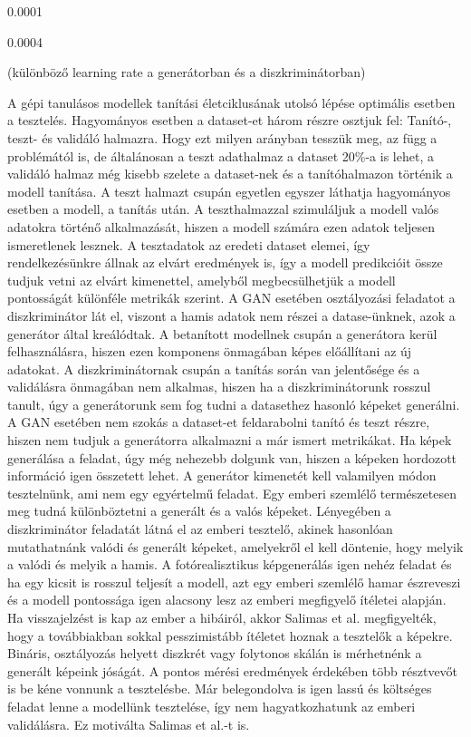 0.0001

0.0004

(különböző learning rate a generátorban és a diszkriminátorban)





A gépi tanulásos modellek tanítási életciklusának utolsó lépése optimális esetben a tesztelés. Hagyományos esetben a dataset-et három részre osztjuk fel: Tanító-, teszt- és validáló halmazra. Hogy ezt milyen arányban tesszük meg, az függ a problémától is, de általánosan a teszt adathalmaz a dataset 20\%-a is lehet, a validáló halmaz még kisebb szelete a dataset-nek és a tanítóhalmazon történik a modell tanítása.
A teszt halmazt csupán egyetlen egyszer láthatja hagyományos esetben a modell, a tanítás után.
A teszthalmazzal szimuláljuk a modell valós adatokra történő alkalmazását, hiszen a modell számára ezen adatok teljesen ismeretlenek lesznek. A tesztadatok az eredeti dataset elemei, így rendelkezésünkre állnak az elvárt eredmények is, így a modell predikcióit össze tudjuk vetni az elvárt kimenettel, amelyből megbecsülhetjük a modell pontosságát különféle metrikák szerint.
A GAN esetében osztályozási feladatot a diszkriminátor lát el, viszont a hamis adatok nem részei a datase-ünknek, azok a generátor által kreálódtak. A betanított modellnek csupán a generátora kerül felhasználásra, hiszen ezen komponens önmagában képes előállítani az új adatokat. A diszkriminátornak csupán a tanítás során van jelentősége és a validálásra önmagában nem alkalmas, hiszen ha a diszkriminátorunk rosszul tanult, úgy a generátorunk sem fog tudni a datasethez hasonló képeket generálni.
A GAN esetében nem szokás a dataset-et feldarabolni tanító és teszt részre, hiszen nem tudjuk a generátorra alkalmazni a már ismert metrikákat.
Ha képek generálása a feladat, úgy még nehezebb dolgunk van, hiszen a képeken hordozott információ igen összetett lehet.
A generátor kimenetét kell valamilyen módon tesztelnünk, ami nem egy egyértelmű feladat.
Egy emberi szemlélő természetesen meg tudná különböztetni a generált és a valós képeket. Lényegében a diszkriminátor feladatát látná el az emberi tesztelő, akinek hasonlóan mutathatnánk valódi és generált képeket, amelyekről el kell döntenie, hogy melyik a valódi és melyik a hamis. A fotórealisztikus képgenerálás igen nehéz feladat és ha egy kicsit is rosszul teljesít a modell, azt egy emberi szemlélő hamar észreveszi és a modell pontossága igen alacsony lesz az emberi megfigyelő ítéletei alapján. Ha visszajelzést is kap az ember a hibáiról, akkor Salimas et al. megfigyelték, hogy a továbbiakban sokkal pesszimistább ítéletet hoznak a tesztelők a képekre. Bináris, osztályozás helyett diszkrét vagy folytonos skálán is mérhetnénk a generált képeink jóságát. A pontos mérési eredmények érdekében több résztvevőt is be kéne vonnunk a tesztelésbe. Már belegondolva is igen lassú és költséges feladat lenne a modellünk tesztelése, így nem hagyatkozhatunk az emberi validálásra. Ez motiválta Salimas et al.-t is.

